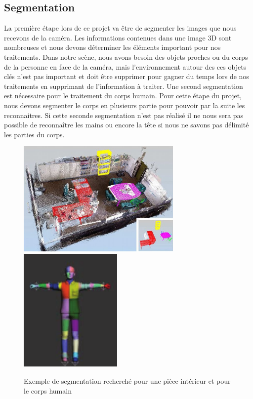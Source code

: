 \subsection{Segmentation}
La première étape lors de ce projet va être de segmenter les images que nous recevons de 
la caméra. Les informations contenues dans une image 3D sont nombreuses et nous devons
déterminer les éléments important pour nos traitements. Dans notre scène,
nous avons besoin des objets proches ou du corps de la personne en face de la caméra, mais 
l'environnement autour des ces objets clés n'est pas important et doit être supprimer pour
gagner du temps lors de nos traitements en supprimant de l'information à traiter.
Une second segmentation est nécessaire pour le traitement du corps humain. Pour cette étape du projet,
nous devons segmenter le corps en plusieurs partie pour pouvoir par la suite les reconnaitres. Si cette
seconde segmentation n'est pas réalisé il ne nous sera pas possible de reconnaître les mains ou encore
la tête si nous ne savons pas délimité les parties du corps.  

\begin{figure}[!ht]
  \begin{center}
    \includegraphics[width=8cm]{image/segmentation.png}
    \includegraphics[width=5cm]{image/bodySegmentation.png}
    \caption{Exemple de segmentation recherché pour une pièce intérieur et pour le corps humain}
  \end{center}
\end{figure}
 

